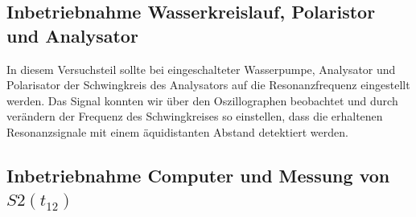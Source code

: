 \documentclass[paper=a4,
	fontsize=10pt,
	DIV=18,
	twocolumn,
	parskip=half
	]{scrartcl}
\numberwithin{equation}{section}    %
\begin{document}

\subsection{Inbetriebnahme Wasserkreislauf, Polaristor und Analysator}
\label{auswertung2}

In diesem Versuchsteil sollte bei eingeschalteter Wasserpumpe, Analysator und Polarisator der Schwingkreis des Analysators auf die Resonanzfrequenz eingestellt werden. Das Signal konnten wir über den Oszillographen beobachtet und durch verändern der Frequenz des Schwingkreises so einstellen, dass die erhaltenen Resonanzsignale mit einem äquidistanten Abstand detektiert werden.


\subsection{Inbetriebnahme Computer und Messung von $S2(t_{12})$}
\label{auswerung3}
\end{document}
